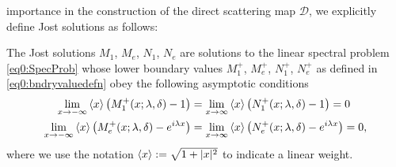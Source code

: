 \documentclass[../dissertation.tex]{subfiles}
\begin{document}
importance in the construction of the direct scattering map $\mathscr D$, we explicitly
define Jost solutions as follows:
\begin{defn}\label{defn0:jost}
	The Jost solutions $M_1$, $M_e$, $N_1$, $N_e$ are solutions to the linear 
	spectral problem \eqref{eq0:SpecProb} whose lower boundary values
	$M_1^+$, $M_e^+$, $N_1^+$, $N_e^+$ as defined in \eqref{eq0:bndryvaluedefn}
	obey the following asymptotic conditions
	\begin{subequations}\label{eq0:JostDEasymp}
		\begin{align}
			\lim_{x\to -\infty} 
					\left\langle x \right\rangle 
					\left( 
						M_1^+(x; \lambda, \delta) - 1 
					\right)
				&= \lim_{x\to \infty} 
						\left\langle x \right\rangle 
						\left( 
							N_1^+(x; \lambda, \delta) - 1
						\right)
				= 0 \\
			\lim_{x\to -\infty} 
					\left\langle x \right\rangle \left( 
						M_e^+(x; \lambda, \delta) - e^{i\lambda x}
					\right)
				&= \lim_{x\to \infty} 
						\left\langle x \right\rangle 
						\left( 
							N_e^+(x; \lambda, \delta) - e^{i\lambda x}
						\right)
				= 0,
		\end{align}
	\end{subequations}
	where we use the notation $\left\langle x \right\rangle:=\sqrt{1+|x|^2}$\label{sym:xbracket} to 
	indicate a linear weight.


\end{defn}
\end{document}
